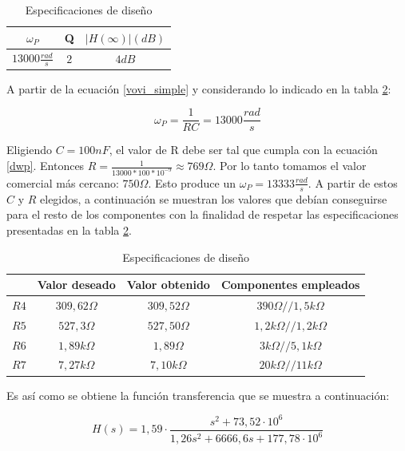 \begin{table}[h!]
	\centering
	\begin{tabular}{c c c}%
		\bfseries $\omega_P$ & Q & $|H(\infty)| (dB)$ \\ \hline
		$13000 \frac{rad}{s}$ & $2$ & $4dB$\\
		\hline
	\end{tabular}
	\caption{Especificaciones de dise\~no}
	\label{especificaciones}
\end{table}

A partir de la ecuaci\'on \ref{vovi_simple} y considerando lo indicado en la tabla \ref{especificaciones}:

\begin{equation}
\omega_P = \frac{1}{RC} = 13000\frac{rad}{s}
\label{dwp}
\end{equation}

Eligiendo $C = 100nF$, el valor de R debe ser tal que cumpla con la ecuaci\'on \ref{dwp}. Entonces $R = \frac{1}{13000 * 100 *10^{-9}} \approx 769\Omega.$ Por lo tanto tomamos el valor comercial m\'as cercano: $750\Omega$. Esto produce un $\omega_P = 13333 \frac{rad}{s}$. A partir de estos $C$ y $R$ elegidos, a continuaci\'on se muestran los valores que deb\'ian conseguirse para el resto de los componentes con la finalidad de respetar las especificaciones presentadas en la tabla \ref{especificaciones}.

\begin{table}[H]
	\centering
	\begin{tabular}{c c c c}%
		\bfseries  & Valor deseado & Valor obtenido& Componentes empleados \\ \hline
		$R4$ & $309,62\Omega$  & $309,52\Omega$ & $390\Omega // 1,5k\Omega$\\
		$R5$ & $527,3\Omega$  & $527,50\Omega$ & $1,2k\Omega // 1,2k\Omega$\\
		$R6$ & $1,89k\Omega$  & $1,89\Omega$ & $3k\Omega // 5,1k\Omega$\\
		$R7$ & $7,27k\Omega$  & $7,10k\Omega$ & $20k\Omega // 11k\Omega$\\
		\hline
	\end{tabular}
	\caption{Especificaciones de dise\~no}
	\label{especificaciones}
\end{table}

Es as\'i como se obtiene la funci\'on transferencia que se muestra a continuaci\'on:

\begin{equation}
H(s) = 1,59 \cdot \frac{s^2+73,52 \cdot 10^6}{1,26 s^2 + 6666,6 s + 177,78 \cdot 10^6}
\label{vovi_val}
\end{equation}


